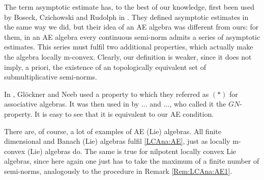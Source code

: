 \begin{remark}
	\label{Rem:LCAna:AE2}
	\mbox{}
	\begin{remarklist}
		\item
		The term asymptotic estimate has, to the best of our knowledge, 
		first been used by Boseck, Czichowski and Rudolph in 
		\cite{BCR:AsympEsti:1981}. They defined asymptotic estimates in 
		the same way we did, but their idea of an AE algebra was different 
		from ours: for them, in an AE algebra every continuous semi-norm 
		admits a series of asymptotic estimates. This series must fulfil two 
		additional properties, which actually make the algebra locally 
		m-convex. Clearly, our definition is weaker,	since it does not imply, 
		a priori, the existence of an topologically 
		equivalent set of submultiplicative semi-norms.
		
		\item
		In \cite{GN:CIARegGroup:2012}, Gl\"ockner and Neeb used a property to 
		which they referred as $(*)$ for associative algebras. It was then 
		used in 	\cite{} by ... and ..., who called it the $GN$-property. It 
		is easy to see that it is equivalent to our AE condition. 
	\end{remarklist}
\end{remark}

There are, of course, a lot of examples of AE (Lie) algebras. 
All finite dimensional and Banach (Lie) algebras fulfil 
\eqref{LCAna:AE}, just as locally m-convex (Lie) algebras do. 
The same is true for nilpotent locally convex Lie algebras, 
since here again one just has to take the maximum of a finite 
number of semi-norms, analogously to the procedure in Remark 
\ref{Rem:LCAna:AE1}.

